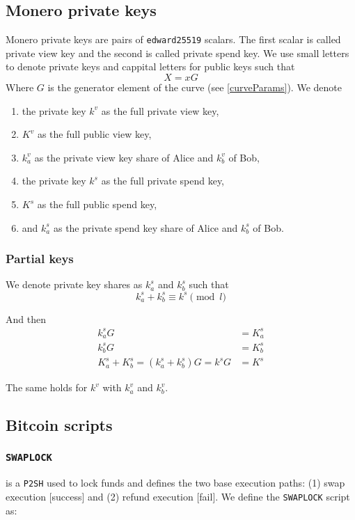 \documentclass{llncs}
\begin{document}
\subsection{Monero private keys}
Monero private keys are pairs of \texttt{edward25519} scalars. The first scalar is called private view key and the second is called private spend key. We use small letters to denote private keys and cappital letters for public keys such that
$$X = xG$$
Where $G$ is the generator element of the curve (see \ref{curveParams}). We denote
\begin{enumerate}[label=(\roman*)]
    \item the private key $k^v$ as the full private view key,
    \item $K^v$ as the full public view key,
    \item $k^v_a$ as the private view key share of Alice and $k^v_b$ of Bob,
    \item the private key $k^s$ as the full private spend key,
    \item $K^s$ as the full public spend key,
    \item and $k^s_a$ as the private spend key share of Alice and $k^s_b$ of Bob.
\end{enumerate}

\subsubsection{Partial keys}
We denote private key shares as $k^s_a$ and $k^s_b$ such that
$$k^s_a + k^s_b \equiv k^s \pmod l$$

And then
\begin{equation}
\begin{split}
    k^s_aG &= K^s_a \\
    k^s_bG &= K^s_b \\
    K^s_a + K^s_b = (k^s_a + k^s_b)G = k^sG &= K^s
\end{split}
\end{equation}

The same holds for $k^v$ with $k^v_a$ and $k^v_b$.

\subsection{Bitcoin scripts}

\subsubsection{\texttt{SWAPLOCK}}
is a \texttt{P2SH} used to lock funds and defines the two base execution paths: (1) swap execution [success] and (2) refund execution [fail]. We define the \texttt{SWAPLOCK} script as:
\end{document}
